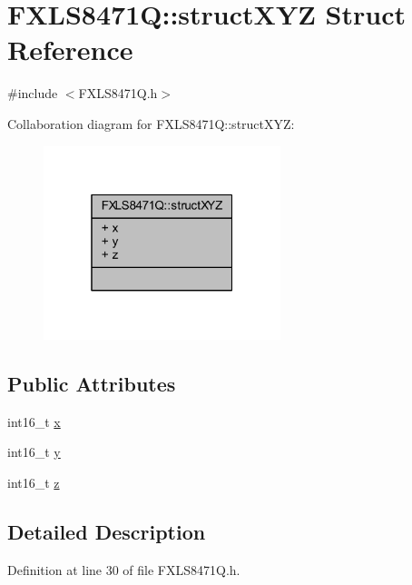 \hypertarget{struct_f_x_l_s8471_q_1_1struct_x_y_z}{}\section{F\+X\+L\+S8471Q\+:\+:struct\+X\+YZ Struct Reference}
\label{struct_f_x_l_s8471_q_1_1struct_x_y_z}


{\ttfamily \#include $<$F\+X\+L\+S8471\+Q.\+h$>$}



Collaboration diagram for F\+X\+L\+S8471Q\+:\+:struct\+X\+YZ\+:\nopagebreak
\begin{figure}[H]
\begin{center}
\leavevmode
\includegraphics[width=196pt]{struct_f_x_l_s8471_q_1_1struct_x_y_z__coll__graph}
\end{center}
\end{figure}
\subsection*{Public Attributes}
\begin{DoxyCompactItemize}
\item 
int16\+\_\+t \hyperlink{struct_f_x_l_s8471_q_1_1struct_x_y_z_a75aa25b4a345e62c9526e0951f78da69}{x}
\item 
int16\+\_\+t \hyperlink{struct_f_x_l_s8471_q_1_1struct_x_y_z_a504ed67fe6a31f16a8e48f48d2c6437f}{y}
\item 
int16\+\_\+t \hyperlink{struct_f_x_l_s8471_q_1_1struct_x_y_z_ac5d90008571d14b4b7a370c8f4e58910}{z}
\end{DoxyCompactItemize}


\subsection{Detailed Description}


Definition at line 30 of file F\+X\+L\+S8471\+Q.\+h.



